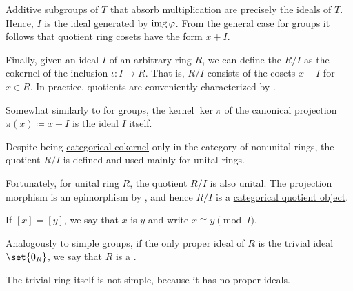 \begin{definition}
\begin{thmenum}
    Additive subgroups of \( T \) that absorb multiplication are precisely the \hyperref[def:semiring_ideal]{ideals} of \( T \). Hence, \( I \) is the ideal generated by \( \operatorname{img} \varphi \). From the general case for groups it follows that quotient ring cosets have the form \( x + I \).

    Finally, given an ideal \( I \) of an arbitrary ring \( R \), we can define the  \( R / I \) as the cokernel of the inclusion \( \iota: I \to R \). That is, \( R / I \) consists of the cosets \( x + I \) for \( x \in R \). In practice, quotients are conveniently characterized by .

    Somewhat similarly to  for groups, the kernel \( \ker \pi \) of the canonical projection \( \pi(x) \coloneqq x + I \) is the ideal \( I \) itself.

    Despite being \hyperref[def:zero_morphisms/cokernel]{categorical cokernel} only in the category of nonunital rings, the quotient \( R / I \) is defined and used mainly for unital rings.

    Fortunately, for unital ring \( R \), the quotient \( R / I \) is also unital. The projection morphism is an epimorphism by , and hence \( R / I \) is a \hyperref[def:subobject_and_quotient]{categorical quotient object}.

    If \( [x] = [y] \), we say that \( x \) is  \( y \) and write \( x \cong y \pmod I \).

     Analogously to \hyperref[def:group/simple]{simple groups}, if the only proper \hyperref[def:semiring_ideal]{ideal} of \( R \) is the \hyperref[def:ring/trivial]{trivial ideal} \( \set{ 0_R } \), we say that \( R \) is a .

    The trivial ring itself is not simple, because it has no proper ideals.
  \end{thmenum}
\end{definition}

